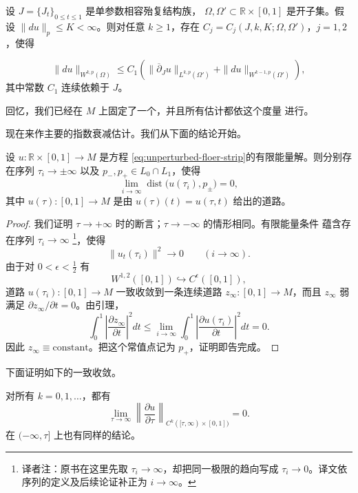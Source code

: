 \begin{proposition}
\label{prop:nonlinear-dbar-boundary-estimate}
设 $J=\{J_t\}_{0\leq t\leq1}$ 是单参数相容殆复结构族，
$\Omega,\Omega'\subset\mathbb R\times[0,1]$ 是开子集。假设
$\|du\|_p\leq K<\infty$。则对任意 $k\geq1$，存在
$C_j=C_j(J,k,K;\Omega,\Omega')$，$j=1,2$，使得

\begin{equation}
  \|du\|_{W^{k,p}(\Omega)}
  \leq
  C_1\left(
    \|\overline\partial_Ju\|_{L^{k,p}(\Omega')}
    +\|du\|_{W^{k-1,p}(\Omega')}
  \right),
\label{eq:nonlinear-dbar-boundary-estimate}
\end{equation}
其中常数 $C_1$ 连续依赖于 $J$。
\end{proposition}

回忆，我们已经在 $M$ 上固定了一个\termReferenceMetric{}，并且所有估计都依这个度量
进行。

现在来作主要的指数衰减估计。我们从下面的\termSubsequenceConvergence{}结论开始。

\begin{lemma}
\label{lem:finite-energy-subsequence-limits}
设 $u:\mathbb R\times[0,1]\to M$ 是方程
\eqref{eq:unperturbed-floer-strip}的有限能量解。则分别存在序列
$\tau_i\to\pm\infty$ 以及 $p_-,p_+\in L_0\cap L_1$，使得
\[
  \lim_{i\to\infty}\operatorname{dist}\bigl(u(\tau_i),p_\pm\bigr)=0,
\]
其中 $u(\tau):[0,1]\to M$ 是由 $u(\tau)(t)=u(\tau,t)$ 给出的道路。
\end{lemma}

\begin{proof}
我们证明 $\tau\to+\infty$ 时的断言；$\tau\to-\infty$ 的情形相同。有限能量条件
蕴含存在序列 $\tau_i\to\infty$
\footnote{译者注：原书在这里先取 $\tau_i\to\infty$，却把同一极限的趋向写成
$\tau_i\to0$。译文依序列的定义及后续论证补正为 $i\to\infty$。}，使得
\[
  \|u_t(\tau_i)\|^2\longrightarrow0
  \qquad(i\to\infty).
\]
由于对 $0<\epsilon<\frac12$ 有
\[
  W^{1,2}([0,1])\hookrightarrow C^\epsilon([0,1]),
\]
道路 $u(\tau_i):[0,1]\to M$ 一致收敛到一条连续道路
$z_\infty:[0,1]\to M$，而且 $z_\infty$ 弱满足
$\partial z_\infty/\partial t=0$。由\personFatou{}引理，
\[
  \int_0^1
    \left|\frac{\partial z_\infty}{\partial t}\right|^2dt
  \leq
  \lim_{i\to\infty}\int_0^1
    \left|\frac{\partial u(\tau_i)}{\partial t}\right|^2dt
  =0.
\]
因此 $z_\infty\equiv\mathrm{constant}$。把这个常值点记为 $p_+$，证明即告完成。
\end{proof}

下面证明如下的一致收敛。

\begin{lemma}
\label{lem:uniform-derivative-decay}
对所有 $k=0,1,\ldots$，都有
\begin{equation}
  \lim_{\tau\to\infty}
  \left\|
    \frac{\partial u}{\partial\tau}
  \right\|_{C^k([\tau,\infty)\times[0,1])}
  =0.
\label{eq:uniform-derivative-decay}
\end{equation}
在 $(-\infty,\tau]$ 上也有同样的结论。
\end{lemma}

